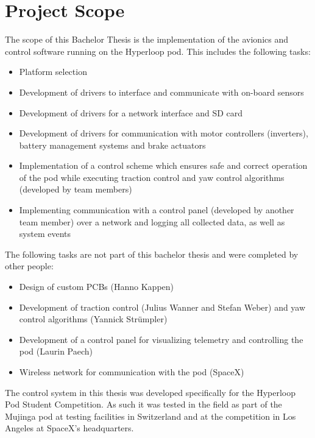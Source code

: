 \section{Project Scope}

The scope of this Bachelor Thesis is the implementation of the avionics and control software running on the Hyperloop pod. This includes the following tasks:

\begin{itemize}
    \item Platform selection
    \item Development of drivers to interface and communicate with on-board sensors
    \item Development of drivers for a network interface and SD card
    \item Development of drivers for communication with motor controllers (inverters), battery management systems and brake actuators
    \item Implementation of a control scheme which ensures safe and correct operation of the pod while executing traction control and yaw control algorithms (developed by team members)
    \item Implementing communication with a control panel (developed by another team member) over a network and logging all collected data, as well as system events
\end{itemize}

The following tasks are not part of this bachelor thesis and were completed by other people:

\begin{itemize}
    \item Design of custom PCBs (Hanno Kappen)
    \item Development of traction control (Julius Wanner and Stefan Weber) and yaw control algorithms (Yannick Strümpler)
    \item Development of a control panel for visualizing telemetry and controlling the pod (Laurin Paech)
    \item Wireless network for communication with the pod (SpaceX)
\end{itemize}

The control system in this thesis was developed specifically for the Hyperloop Pod Student Competition. As such it was tested in the field as part of the Mujinga pod at testing facilities in Switzerland and at the competition in Los Angeles at SpaceX's headquarters.

